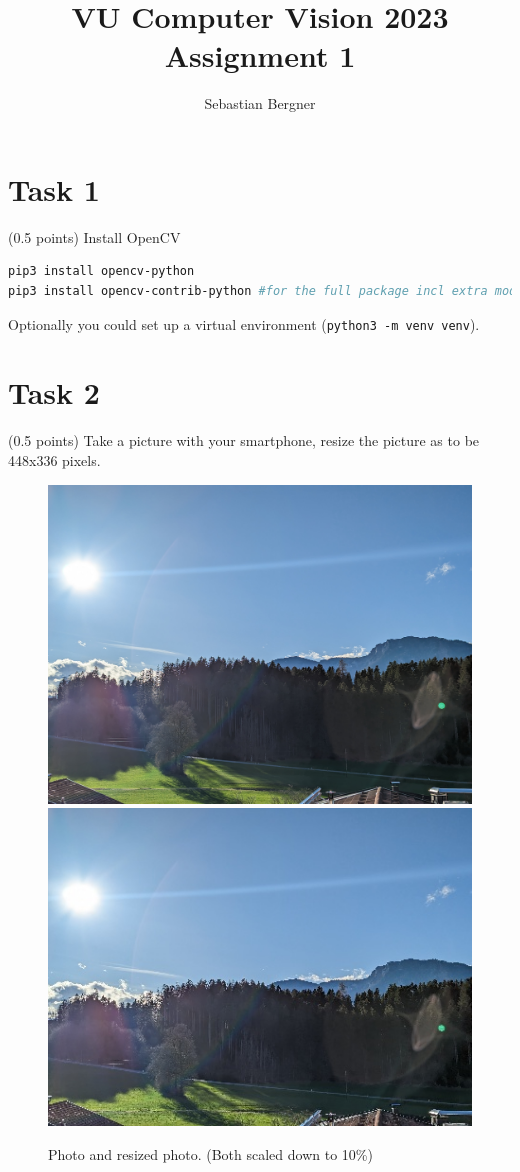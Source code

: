 \documentclass[UTF-8]{article}
\title{VU Computer Vision 2023 \\
	\large Assignment 1} %
\author{Sebastian Bergner}
\begin{document}
	
	\maketitle
	
	\section*{Task 1}
	(0.5 points) Install OpenCV\\
	
	\begin{lstlisting}[language=bash]
pip3 install opencv-python
pip3 install opencv-contrib-python #for the full package incl extra modules\end{lstlisting}
Optionally you could set up a virtual environment (\verb|python3 -m venv venv|).

\section*{Task 2}
(0.5 points) Take a picture with your smartphone, resize the picture as to be 448x336 pixels.
	
\begin{figure}[H]
	\centering
	\includegraphics[scale=0.1]{photo}
	\includegraphics[scale=0.1]{resized_photo}
	\caption{Photo and resized photo. (Both scaled down to 10\%)}
	\label{fig:resizedphoto}
\end{figure}
\end{document}
